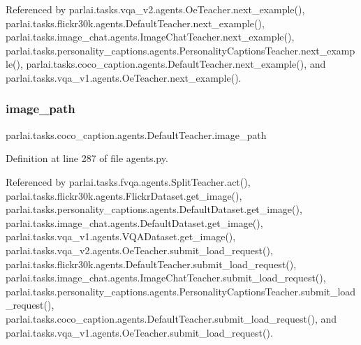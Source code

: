 Referenced by parlai.\+tasks.\+vqa\+\_\+v2.\+agents.\+Oe\+Teacher.\+next\+\_\+example(), parlai.\+tasks.\+flickr30k.\+agents.\+Default\+Teacher.\+next\+\_\+example(), parlai.\+tasks.\+image\+\_\+chat.\+agents.\+Image\+Chat\+Teacher.\+next\+\_\+example(), parlai.\+tasks.\+personality\+\_\+captions.\+agents.\+Personality\+Captions\+Teacher.\+next\+\_\+example(), parlai.\+tasks.\+coco\+\_\+caption.\+agents.\+Default\+Teacher.\+next\+\_\+example(), and parlai.\+tasks.\+vqa\+\_\+v1.\+agents.\+Oe\+Teacher.\+next\+\_\+example().

\mbox{\label{classparlai_1_1tasks_1_1coco__caption_1_1agents_1_1DefaultTeacher_afc29d1b2c83ba32ca3fe553c02c873b9}} 
\subsubsection{\texorpdfstring{image\+\_\+path}{image\_path}}
{\footnotesize\ttfamily parlai.\+tasks.\+coco\+\_\+caption.\+agents.\+Default\+Teacher.\+image\+\_\+path}



Definition at line 287 of file agents.\+py.



Referenced by parlai.\+tasks.\+fvqa.\+agents.\+Split\+Teacher.\+act(), parlai.\+tasks.\+flickr30k.\+agents.\+Flickr\+Dataset.\+get\+\_\+image(), parlai.\+tasks.\+personality\+\_\+captions.\+agents.\+Default\+Dataset.\+get\+\_\+image(), parlai.\+tasks.\+image\+\_\+chat.\+agents.\+Default\+Dataset.\+get\+\_\+image(), parlai.\+tasks.\+vqa\+\_\+v1.\+agents.\+V\+Q\+A\+Dataset.\+get\+\_\+image(), parlai.\+tasks.\+vqa\+\_\+v2.\+agents.\+Oe\+Teacher.\+submit\+\_\+load\+\_\+request(), parlai.\+tasks.\+flickr30k.\+agents.\+Default\+Teacher.\+submit\+\_\+load\+\_\+request(), parlai.\+tasks.\+image\+\_\+chat.\+agents.\+Image\+Chat\+Teacher.\+submit\+\_\+load\+\_\+request(), parlai.\+tasks.\+personality\+\_\+captions.\+agents.\+Personality\+Captions\+Teacher.\+submit\+\_\+load\+\_\+request(), parlai.\+tasks.\+coco\+\_\+caption.\+agents.\+Default\+Teacher.\+submit\+\_\+load\+\_\+request(), and parlai.\+tasks.\+vqa\+\_\+v1.\+agents.\+Oe\+Teacher.\+submit\+\_\+load\+\_\+request().

